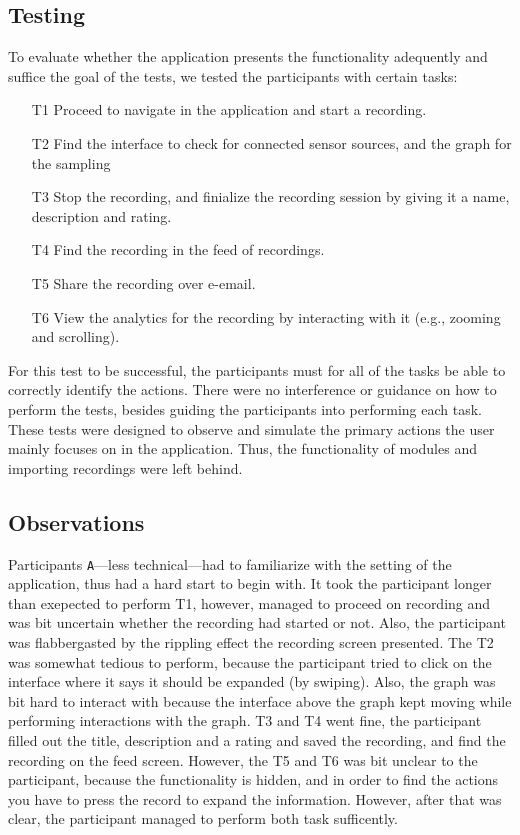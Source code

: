 \subsection{Testing}
To evaluate whether the application presents the functionality adequently and suffice the goal of the tests, we tested the participants with certain tasks:
\begin{itemize}
    \item[T1] Proceed to navigate in the application and start a recording.
    \item[T2] Find the interface to check for connected sensor sources, and the graph for the sampling
    \item[T3] Stop the recording, and finialize the recording session by giving it a name, description and rating.
    \item[T4] Find the recording in the feed of recordings. 
    \item[T5] Share the recording over e-email.
    \item[T6] View the analytics for the recording by interacting with it (e.g., zooming and scrolling). 
\end{itemize}

For this test to be successful, the participants must for all of the tasks be able to correctly identify the actions. There were no interference or guidance on how to perform the tests, besides guiding the participants into performing each task. These tests were designed to observe and simulate the primary actions the user mainly focuses on in the application. Thus, the functionality of modules and importing recordings were left behind. 


\subsection{Observations}
Participants \verb|A|---less technical---had to familiarize with the setting of the application, thus had a hard start to begin with. It took the participant longer than exepected to perform T1, however, managed to proceed on recording and was bit uncertain whether the recording had started or not. Also, the participant was flabbergasted by the rippling effect the recording screen presented. The T2 was somewhat tedious to perform, because the participant tried to click on the interface where it says it should be expanded (by swiping). Also, the graph was bit hard to interact with because the interface above the graph kept moving while performing interactions with the graph. T3 and T4 went fine, the participant filled out the title, description and a rating and saved the recording, and find the recording on the feed screen. However, the T5 and T6 was bit unclear to the participant, because the functionality is hidden, and in order to find the actions you have to press the record to expand the information. However, after that was clear, the participant managed to perform both task sufficently. 

